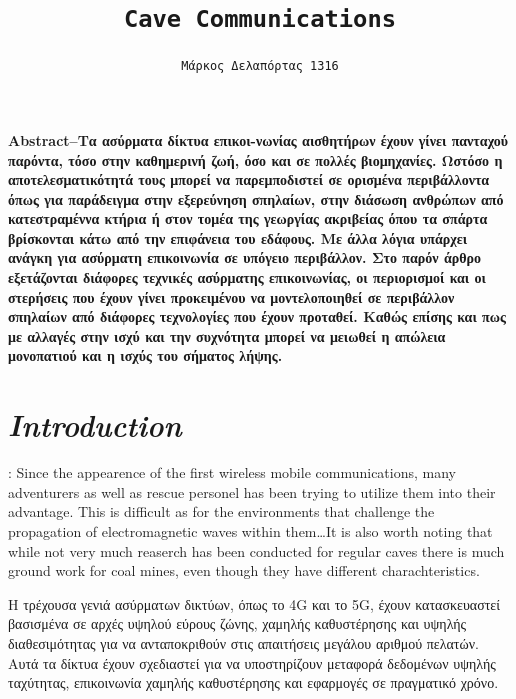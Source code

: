 \documentclass[12pt]{article}
\title{\texttt{Cave Communications}}
\author{\texttt{Μάρκος Δελαπόρτας 1316}}
\date{}
\begin{document}
\maketitle


\begin{multicols}{2}
    \scriptsize \textbf{
        Abstract--Τα ασύρματα δίκτυα επικοι-νωνίας αισθητήρων έχουν γίνει
        πανταχού παρόντα, τόσο στην καθημερινή ζωή, όσο και σε πολλές βιομηχανίες. 
        Ωστόσο η αποτελεσματικότητά τους μπορεί να παρεμποδιστεί σε
        ορισμένα περιβάλλοντα όπως για παράδειγμα στην εξερεύνηση σπηλαίων, 
        στην διάσωση ανθρώπων από κατεστραμέννα κτήρια ή στον τομέα της γεωργίας ακριβείας 
        όπου τα σπάρτα βρίσκονται κάτω από την επιφάνεια του εδάφους. 
        Με άλλα λόγια υπάρχει ανάγκη για ασύρματη επικοινωνία σε υπόγειο περιβάλλον. 
        Στο παρόν άρθρο εξετάζονται διάφορες τεχνικές ασύρματης επικοινωνίας, 
        οι περιορισμοί και οι στερήσεις που έχουν γίνει προκειμένου να μοντελοποιηθεί σε περιβάλλον σπηλαίων από διάφορες τεχνολογίες που έχουν προταθεί. 
        Καθώς επίσης και πως με αλλαγές στην ισχύ και την συχνότητα μπορεί
        να μειωθεί η απώλεια
        μονοπατιού και η ισχύς του σήματος λήψης.
    }
    
    \section{\textit{\normalsize Introduction}}:
    Since the appearence of the first wireless mobile communications,
    many adventurers as well as rescue personel has been trying to utilize them into their advantage. This is difficult as for the environments that challenge the propagation of electromagnetic waves within them\dots It is also worth noting that while not very much reaserch has been conducted for regular caves there is much ground work for coal mines, even though they have different charachteristics.
    
    
    Η τρέχουσα γενιά ασύρματων δικτύων, όπως το 4G και το 5G, 
    έχουν κατασκευαστεί βασισμένα σε αρχές υψηλού εύρους ζώνης, 
    χαμηλής καθυστέρησης και υψηλής διαθεσιμότητας για να ανταποκριθούν
    στις απαιτήσεις μεγάλου αριθμού πελατών. 
    Αυτά τα δίκτυα έχουν σχεδιαστεί για να υποστηρίζουν μεταφορά δεδομένων υψηλής ταχύτητας, 
    επικοινωνία χαμηλής καθυστέρησης και εφαρμογές σε πραγματικό χρόνο.
    

\end{multicols}
\end{document}
